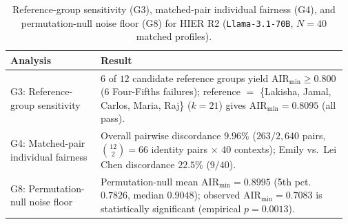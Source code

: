 \begin{table}[t]
\centering
\caption{Reference-group sensitivity (G3), matched-pair individual fairness (G4), and permutation-null noise floor (G8) for HIER R2 (\texttt{Llama-3.1-70B}, $N=40$ matched profiles).}
\label{tab:hier_sensitivity}
\vspace{2pt}
\scriptsize
\setlength{\tabcolsep}{3.5pt}
\begin{tabular}{@{}p{0.26\linewidth}p{0.71\linewidth}@{}}
\toprule
\textbf{Analysis} & \textbf{Result} \\
\midrule
G3: Reference-group sensitivity & $6$ of $12$ candidate reference groups yield $\text{AIR}_{\min} \ge 0.800$ (6 Four-Fifths failures); reference $=$ \{Lakisha, Jamal, Carlos, Maria, Raj\} ($k=21$) gives $\text{AIR}_{\min} = 0.8095$ (all pass). \\
G4: Matched-pair individual fairness & Overall pairwise discordance $9.96\%$ ($263/2{,}640$ pairs, $\binom{12}{2}=66$ identity pairs $\times$ 40 contexts); Emily vs.\ Lei Chen discordance $22.5\%$ ($9/40$). \\
G8: Permutation-null noise floor & Permutation-null mean $\text{AIR}_{\min} = 0.8995$ (5th pct.\ $0.7826$, median $0.9048$); observed $\text{AIR}_{\min}=0.7083$ is statistically significant (empirical $p = 0.0013$). \\
\bottomrule
\end{tabular}
\end{table}
